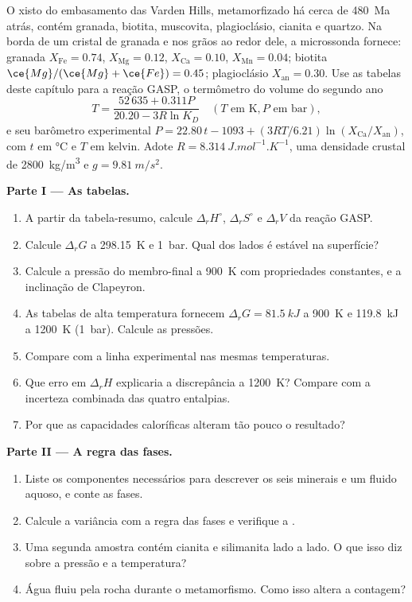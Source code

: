 \begin{problem}
\label{pb:b3:petrological-thermodynamics:1}
O xisto do embasamento das Varden Hills, metamorfizado há cerca de
\qty{480}{Ma} atrás, contém granada, biotita, muscovita, plagioclásio, cianita e
quartzo. Na borda de um cristal de granada e nos grãos ao redor dele, a microssonda
fornece: granada $X_{\text{Fe}} = 0.74$, $X_{\text{Mg}} = 0.12$, $X_{\text{Ca}} =
0.10$, $X_{\text{Mn}} = 0.04$; biotita $\ce{Mg}/(\ce{Mg} + \ce{Fe}) = 0.45$;
plagioclásio $X_{\text{an}} = 0.30$. Use as tabelas deste capítulo para a
reação GASP, o termômetro do volume do segundo ano
\[
T = \frac{52\,635 + 0.311P}{20.20 - 3R\ln K_D}\quad(T \text{ em K}, P
\text{ em bar}),
\]
e seu barômetro experimental $P = 22.80\,t - 1093 + (3RT/6.21)\ln
(X_{\text{Ca}}/X_{\text{an}})$, com $t$ em \unit{\celsius} e $T$ em
kelvin. Adote $R = \qty{8.314}{J.mol^{-1}.K^{-1}}$, uma densidade crustal de
\qty{2800}{kg/m^3} e $g = \qty{9.81}{m/s^2}$.

\medskip\noindent\textbf{Parte I --- As tabelas.}
\begin{enumerate}
  \item A partir da tabela-resumo, calcule $\Delta_rH^\circ$, $\Delta_rS^\circ$
        e $\Delta_rV$ da reação GASP.
  \item Calcule $\Delta_rG$ a \qty{298.15}{K} e \qty{1}{bar}. Qual dos lados
        é estável na superfície?
  \item Calcule a pressão do membro-final a \qty{900}{K} com
        propriedades constantes, e a inclinação de Clapeyron.
  \item As tabelas de alta temperatura fornecem $\Delta_rG = \qty{81.5}{kJ}$ a
        \qty{900}{K} e \qty{119.8}{kJ} a \qty{1200}{K} (\qty{1}{bar}).
        Calcule as pressões.
  \item Compare com a linha experimental nas mesmas temperaturas.
  \item Que erro em $\Delta_rH$ explicaria a discrepância a \qty{1200}{K}?
        Compare com a incerteza combinada das quatro entalpias.
  \item Por que as capacidades caloríficas alteram tão pouco o resultado?
\end{enumerate}

\medskip\noindent\textbf{Parte II --- A regra das fases.}
\begin{enumerate}[resume]
  \item Liste os componentes necessários para descrever os seis minerais e um
        fluido aquoso, e conte as fases.
  \item Calcule a variância com a regra das fases e verifique a .
  \item Uma segunda amostra contém cianita e silimanita lado a lado. O que isso
        diz sobre a pressão e a temperatura?
  \item Água fluiu pela rocha durante o metamorfismo. Como isso
        altera a contagem?
\end{enumerate}


\end{problem}
